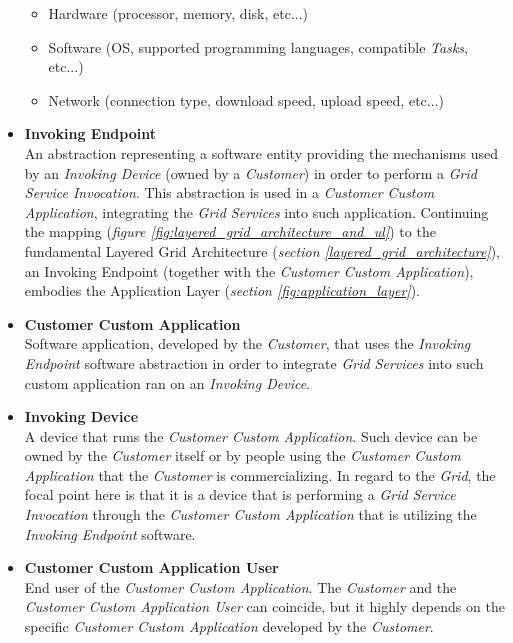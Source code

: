 \begin{itemize}
    \begin{itemize}
        \item Hardware (processor, memory, disk, etc...)
        \item Software (OS, supported programming languages, compatible \textit{Tasks}, etc...)
        \item Network (connection type, download speed, upload speed, etc...)
    \end{itemize}
    \item \textbf{Invoking Endpoint}\label{invoking_endpoint}\\
    An abstraction representing a software entity providing the mechanisms used by an \textit{Invoking Device} (owned by a \textit{Customer}) in order to perform a \textit{Grid Service Invocation}. This abstraction is used in a \textit{Customer Custom Application}, integrating the \textit{Grid Services} into such application. Continuing the mapping (\textit{figure \ref{fig:layered_grid_architecture_and_ul}}) to the fundamental Layered Grid Architecture (\textit{section \ref{layered_grid_architecture}}), an Invoking Endpoint (together with the \textit{Customer Custom Application}), embodies the Application Layer (\textit{section \ref{fig:application_layer}}).
    \item \textbf{Customer Custom Application}\label{customer_custom_application}\\
    Software application, developed by the \textit{Customer}, that uses the \textit{Invoking Endpoint} software abstraction in order to integrate \textit{Grid Services} into such custom application ran on an \textit{Invoking Device}.
    \vspace{10mm}
    \item \textbf{Invoking Device}\label{invoking_device}\\
    A device that runs the \textit{Customer Custom Application}. Such device can be owned by the \textit{Customer} itself or by people using the \textit{Customer Custom Application} that the \textit{Customer} is commercializing. In regard to the \textit{Grid}, the focal point here is that it is a device that is performing a \textit{Grid Service Invocation} through the \textit{Customer Custom Application} that is utilizing the \textit{Invoking Endpoint} software.
    \item \textbf{Customer Custom Application User}\label{customer_custom_application_user}\\
    End user of the \textit{Customer Custom Application}. The \textit{Customer} and the \textit{Customer Custom Application User} can coincide, but it highly depends on the specific \textit{Customer Custom Application} developed by the \textit{Customer}.

\end{itemize}
